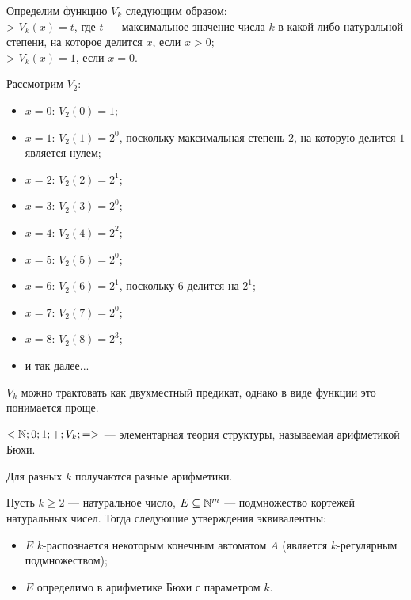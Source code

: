     \begin{Def}[Функция $V_k$]
        Определим функцию $V_k$ следующим образом:\\
        > $V_k(x) = t$, где $t$ --- максимальное значение числа $k$ в какой-либо натуральной степени, на которое делится $x$, если $x > 0$;\\
        > $V_k(x) = 1$, если $x = 0$.
    \end{Def}
    \begin{Example}
        Рассмотрим $V_2$: 
        \begin{itemize}
            \item $x = 0$: $V_2(0) = 1$;
            \item $x = 1$: $V_2(1) = 2^0$, поскольку максимальная степень $2$, на которую делится $1$ является нулем;
            \item $x = 2$: $V_2(2) = 2^1$;
            \item $x = 3$: $V_2(3) = 2^0$;
            \item $x = 4$: $V_2(4) = 2^2$;
            \item $x = 5$: $V_2(5) = 2^0$;
            \item $x = 6$: $V_2(6) = 2^1$, поскольку $6$ делится на $2^1$;
            \item $x = 7$: $V_2(7) = 2^0$;
            \item $x = 8$: $V_2(8) = 2^3$;
            \item и так далее...
        \end{itemize}
    \end{Example}
    \begin{Rem}
        $V_k$ можно трактовать как двухместный предикат, однако в виде функции это понимается проще.
    \end{Rem}
    \begin{Def}
        $<\mathbb{N}; 0; 1; +; V_k; =>$ --- элементарная теория структуры, называемая арифметикой Бюхи.
    \end{Def}
    \begin{Rem}
        Для разных $k$ получаются разные арифметики.
    \end{Rem}
    \begin{Thm}
        Пусть $k \geq 2$ --- натуральное число, $E \subseteq \mathbb{N}^m$ --- подмножество кортежей натуральных чисел. Тогда следующие утверждения эквивалентны:
        \begin{itemize}
            \item $E$ $k$-распознается некоторым конечным автоматом $A$ (является $k$-регулярным подмножеством);
            \item $E$ определимо в арифметике Бюхи с параметром $k$.
        \end{itemize}
    \end{Thm}
